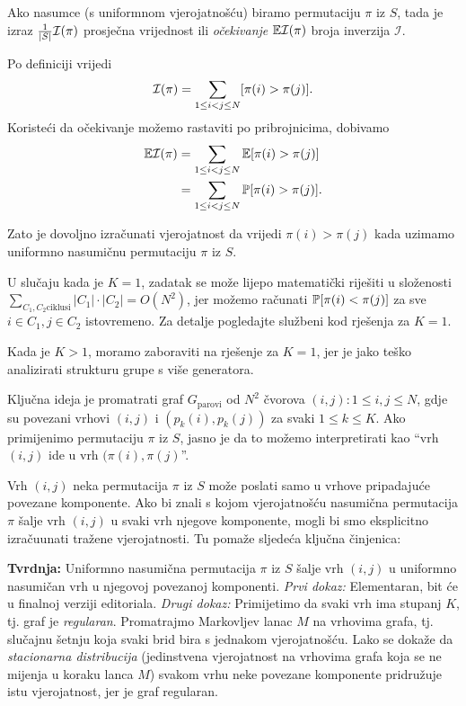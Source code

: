 Ako nasumce (s uniformnom vjerojatnošću) biramo permutaciju $\pi$ iz
$S$, tada je izraz $\frac{1}{|S|} \mathcal I(\pi)$ prosječna vrijednost
ili \textit{očekivanje} $\mathbb E\mathcal{I}(\pi)$ broja inverzija $\mathcal{I}$.

Po definiciji vrijedi
\begin{equation*}
  \mathcal I(\pi) = \sum\limits_{1 \le i < j \le N} [ \pi(i) > \pi(j) ]. 
\end{equation*}
Koristeći da očekivanje možemo rastaviti po pribrojnicima, dobivamo
\begin{align*}
  \mathbb E \mathcal I(\pi)  &= \sum\limits_{1 \le i < j \le N} \mathbb E [ \pi(i) > \pi(j) ] \\
                &= \sum\limits_{1 \le i < j \le N} \mathbb P [ \pi(i) > \pi(j) ]. 
\end{align*}

Zato je dovoljno izračunati vjerojatnost da vrijedi $\pi(i) > \pi(j)$
kada uzimamo uniformno nasumičnu permutaciju $\pi$ iz $S$.

U slučaju kada je $K = 1$, zadatak se može lijepo matematički riješiti
u složenosti $\sum_{C_1, C_2 \text{ciklusi}} |C_1| \cdot |C_2| 
= O(N^2)$, jer možemo računati $\mathbb P[\pi(i) < \pi(j)]$ za
sve $i \in C_1, j \in C_2$ istovremeno. Za detalje pogledajte službeni kod
rješenja za $K = 1$.

Kada je $K > 1$, moramo zaboraviti na rješenje za $K = 1$, jer je jako
teško analizirati strukturu grupe s više generatora.

Ključna ideja je promatrati graf $G_{\text{parovi}}$ 
od $N^2$ čvorova $(i, j) : 1 \le i, j \le N$,
gdje su povezani vrhovi $(i, j)$ i $(p_k(i), p_k(j))$ za svaki $1 \le k \le K$.
Ako primijenimo permutaciju $\pi$ iz $S$, jasno je da to možemo
interpretirati kao ``vrh $(i, j)$ ide u vrh $(\pi(i), \pi(j)$''.

Vrh $(i, j)$ neka permutacija $\pi$ iz $S$ 
može poslati samo u vrhove pripadajuće povezane komponente.
Ako bi znali s kojom vjerojatnošću nasumična permutacija $\pi$
šalje vrh $(i, j)$ u svaki vrh njegove komponente, 
mogli bi smo eksplicitno izračuunati tražene vjerojatnosti.
Tu pomaže sljedeća ključna činjenica:

\textbf{Tvrdnja:} Uniformno nasumična permutacija $\pi$ iz $S$ šalje
vrh $(i, j)$ u uniformno nasumičan vrh u njegovoj povezanoj komponenti.
\textit{Prvi dokaz:} Elementaran, bit će u finalnoj verziji editoriala.
\textit{Drugi dokaz:} Primijetimo da svaki vrh ima stupanj $K$,
tj. graf je \textit{regularan}.
Promatrajmo Markovljev lanac $M$ na vrhovima grafa,
tj. slučajnu šetnju koja svaki brid bira s jednakom vjerojatnošću.
Lako se dokaže da \textit{stacionarna distribucija} (jedinstvena
vjerojatnost na vrhovima grafa koja se ne mijenja u koraku lanca $M$)
svakom vrhu neke povezane komponente pridružuje istu vjerojatnost,
jer je graf regularan. 

